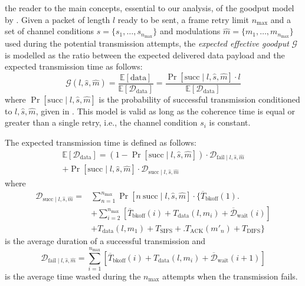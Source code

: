 \documentclass[twoside,nohyper]{tufte-book}
\begin{document}
 the reader to the main concepts, essential to our analysis, of the goodput model by \citet{Qiao2002}. Given a packet of length \(l\) ready to be sent, a frame retry limit \(n_\mathrm{max}\) and a set of channel conditions \(\hat{s}=\{s_1, \ldots, s_{n_\mathrm{max}}\}\) and modulations \(\hat{m}=\{m_1, \ldots, m_{n_\mathrm{max}}\}\) used during the potential transmission attempts, the \emph{expected effective goodput} \(\mathcal{G}\) is modelled as the ratio between the expected delivered data payload and the expected transmission time as follows:
%
\begin{equation}
 \mathcal{G}(l, \hat{s}, \hat{m}) = \frac{{\mathbb E}\left[ \mathrm{data} \right]}{{\mathbb E}\left[ \mathcal{D}_\mathrm{data} \right]} = \frac{\Pr[\mathrm{succ} \mid l, \hat{s}, \hat{m}]\cdot l}{{\mathbb E}\left[ \mathcal{D}_\mathrm{data} \right]}
 \label{eq:goodput}
\end{equation}
%
where \(\Pr[\mathrm{succ} \mid l, \hat{s}, \hat{m}]\) is the probability of successful transmission conditioned to \(l, \hat{s}, \hat{m}\), given in \citet[Equation (5)]{Qiao2002}. This model is valid as long as the coherence time is equal or greater than a single retry, i.e., the channel condition \(s_i\) is constant.

The expected transmission time is defined as follows:
%
\begin{equation}
\begin{split}
 {\mathbb E}\left[ \mathcal{D}_\mathrm{data} \right] = \left(1 - \Pr[\mathrm{succ} \mid l, \hat{s}, \hat{m}]\right) \cdot \mathcal{D}_{\mathrm{fail} \mid l, \hat{s}, \hat{m}} \\
 + \Pr[\mathrm{succ} \mid l, \hat{s}, \hat{m}] \cdot \mathcal{D}_{\mathrm{succ} \mid l, \hat{s}, \hat{m}}
\end{split}
\label{eq:Ddata}
\end{equation}
%
where
%
\begin{equation}
\begin{split}
 \mathcal{D}_{\mathrm{succ} \mid l, \hat{s}, \hat{m}} = &\sum_{n=1}^{n_\mathrm{max}} \Pr[n \mathrm{~succ} \mid l, \hat{s}, \hat{m}] \cdot \biggl\lbrace \overline{T}_\mathrm{bkoff}(1) \biggr. \\
 &+ \sum_{i=2}^{n_\mathrm{max}} \left[\overline{T}_\mathrm{bkoff}(i)\right.+ \left.T_\mathrm{data}(l, m_i) + \overline{\mathcal{D}}_\mathrm{wait}(i)\right] \\
 &+ T_\mathrm{data}(l, m_1) + T_\mathrm{SIFS} + \biggl.T_\mathrm{ACK}(m'_n) + T_\mathrm{DIFS} \biggr\rbrace
\end{split}
\label{eq:Dsucc}
\end{equation}
%
is the average duration of a successful transmission and
%
\begin{equation}
 \mathcal{D}_{\mathrm{fail} \mid l, \hat{s}, \hat{m}} = \sum_{i=1}^{n_\mathrm{max}} \left[\overline{T}_\mathrm{bkoff}(i) + T_\mathrm{data}(l, m_i) + \overline{\mathcal{D}}_\mathrm{wait}(i+1)\right] 
\label{eq:Dfail}
\end{equation}
%
is the average time wasted during the \(n_\mathrm{max}\) attempts when the transmission fails.
\end{document}

